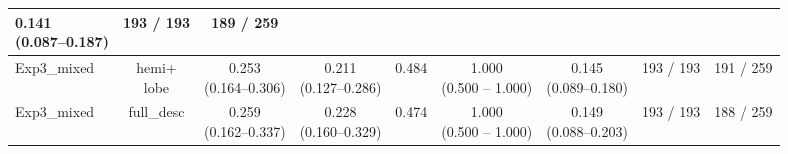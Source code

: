 \documentclass[a4paper,12pt]{article}
\begin{document}
\begin{table}[ht]
\begin{tabular}{lcccccccc}
\makecell{0.141 \\ (0.087--0.187)} &
193 / 193 &
\colorbox{blue!20}{189 / 259} \\
\hline
Exp3\_mixed & 
\makecell{hemi+ \\lobe} &
\makecell{\colorbox{orange!20}{0.253} \\ (0.164--0.306)} &
\makecell{\colorbox{orange!20}{0.211} \\ (0.127--0.286)} &
\colorbox{orange!20}{0.484} &
\makecell{1.000 \\ (0.500 -- 1.000)}&
\makecell{\colorbox{orange!20}{0.145} \\ (0.089--0.180)} &
193 / 193 &
\colorbox{green!20}{191 / 259} \\
\hline
Exp3\_mixed & 
full\_desc &
\makecell{\colorbox{blue!20}{0.259} \\ (0.162--0.337)} &
\makecell{\colorbox{green!20}{0.228} \\ (0.160--0.329)} &
0.474 &
\makecell{1.000 \\ (0.500 -- 1.000)}&
\makecell{\colorbox{blue!20}{0.149} \\ (0.088--0.203)} &
193 / 193 &
\colorbox{orange!20}{188 / 259} \\

\hline
\end{tabular}
\end{table}
\end{document}
